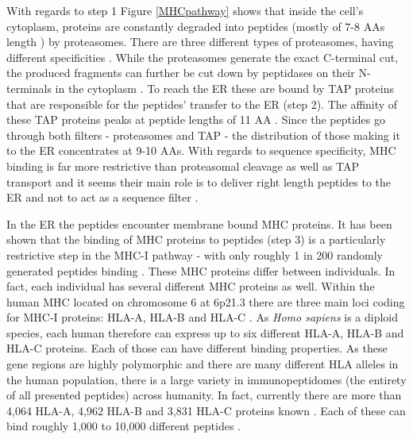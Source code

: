 \documentclass[msc,deptreport,ai]{infthesis} %
\begin{document}
		With regards to step 1 Figure \ref{MHCpathway} shows that inside the cell's cytoplasm, proteins are constantly degraded into peptides (mostly of 7-8 \glspl{AA} length \cite{nielsen_immunoinformatics_2020}) by proteasomes. There are three different types of proteasomes, having different specificities \cite{rock_present_2016}. While the proteasomes generate the exact C-terminal cut, the produced fragments can further be cut down by peptidases on their N-terminals in the cytoplasm \cite{nielsen_role_2005}. To reach the \gls{ER} these are bound by \gls{TAP} proteins that are responsible for the peptides' transfer to the \gls{ER} (step 2). The affinity of these \gls{TAP} proteins peaks at peptide lengths of 11 \gls{AA} \cite{nielsen_immunoinformatics_2020}. Since the peptides go through both filters - proteasomes and \gls{TAP} - the distribution of those making it to the \gls{ER} concentrates at 9-10 \glspl{AA}. With regards to sequence specificity, \gls{MHC} binding is far more restrictive than proteasomal cleavage as well as \gls{TAP} transport and it seems their main role is to deliver right length peptides to the \gls{ER} and not to act as a sequence filter \cite{nielsen_immunoinformatics_2020}.
	
		In the \gls{ER} the peptides encounter membrane bound \gls{MHC} proteins. It has been shown that the binding of \gls{MHC} proteins to peptides (step 3) is a particularly restrictive step in the \gls{MHC-I} pathway - with only roughly 1 in 200 randomly generated peptides binding \cite{yewdell_immunodominance_1999}. These \gls{MHC} proteins differ between individuals. In fact, each individual has several different \gls{MHC} proteins as well. Within the human MHC located on chromosome 6 at 6p21.3 there are three main loci coding for \gls{MHC-I} proteins: HLA-A, HLA-B and HLA-C \cite{mosaad_clinical_2015}. As \textit{Homo sapiens} is a diploid species, each human therefore can express up to six different HLA-A, HLA-B and HLA-C proteins. Each of those can have different binding properties. As these gene regions are highly polymorphic and there are many different \gls{HLA} alleles in the human population, there is a large variety in immunopeptidomes (the entirety of all presented peptides) across humanity. In fact, currently there are more than  4,064 HLA-A, 4,962 HLA-B and 3,831 HLA-C proteins known \cite{ebi_immuno_2021}. Each of these can bind roughly 1,000 to 10,000 different peptides \cite{abelin_mass_2017}.
	
\end{document}
